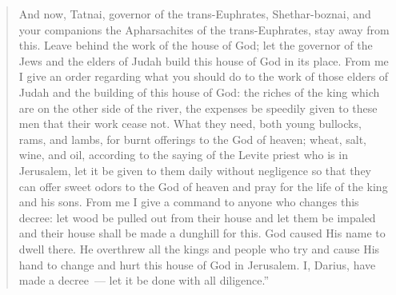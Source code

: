\begin{quotation}
\begin{inparaenum}
     And now, Tatnai, governor of the trans-Euphrates, Shethar-boznai, and your companions the Apharsachites of the trans-Euphrates, stay away from this.%
     Leave behind the work of the house of God; let the governor of the Jews and the elders of Judah build this house of God in its place.%
     From me I give an order regarding what you should do to the work of those elders of Judah and the building of this house of God: the riches of the king which are on the other side of the river, the expenses be speedily given to these men that their work cease not.%
     What they need, both young bullocks, rams, and lambs, for burnt offerings to the God of heaven; wheat, salt, wine, and oil, according to the saying of the Levite priest who is in Jerusalem, let it be given to them daily without negligence%
     so that they can offer sweet odors to the God of heaven and pray for the life of the king and his sons.%
     From me I give a command to anyone who changes this decree: let wood be pulled out from their house and let them be impaled and their house shall be made a dunghill for this.%
     God caused His name to dwell there. He overthrew all the kings and people who try and cause His hand to change and hurt this house of God in Jerusalem. I, Darius, have made a decree~--- let it be done with all diligence.''%
  \end{inparaenum}
\end{quotation}

